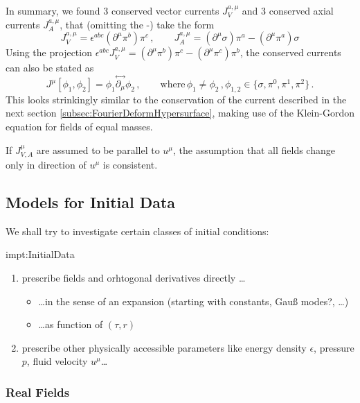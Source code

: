 In summary, we found 3 conserved vector currents $J_V^{a,\mu}$ and 3 conserved axial currents $J_A^{a,\mu}$, that (omitting the -) take the form
\begin{equation}
    J_V^{a,\mu}=\epsilon^{abc}(\partial^\mu\pi^b)\pi^c\,,\qquad J_A^{a,\mu}=(\partial^\mu\sigma)\pi^a-(\partial^\mu\pi^a)\sigma
\end{equation}
Using the projection $\epsilon^{abc}J_V^{a,\mu}=(\partial^\mu\pi^b)\pi^c-(\partial^\mu\pi^c)\pi^b$, the conserved currents can also be stated as
\begin{equation}
    J^\mu[\phi_1,\phi_2]=\phi_1\overset{\leftrightarrow}{\partial_\mu}\phi_2\,,\qquad\text{where}\,\phi_{1}\neq\phi_2\,,\phi_{1,2}\in\{\sigma,\pi^0,\pi^1,\pi^2\}\,.
\end{equation}
This looks strinkingly similar to the conservation of the current described in the next section \eqref{subsec:FourierDeformHypersurface}, making use of the Klein-Gordon equation for fields of equal masses.

If $J^\mu_{V,A}$ are assumed to be parallel to $u^\mu$, the assumption that all fields change only in direction of $u^\mu$ is consistent.


\subsection{Models for Initial Data}

We shall try to investigate certain classes of initial conditions:
\begin{impt}{impt:InitialData}
\begin{enumerate}
    \item prescribe fields and orhtogonal derivatives directly \dots
    \begin{itemize}
        \item \dots in the sense of an expansion (starting with constants, Gauß modes?, \dots)
        \item \dots as function of $(\tau,r)$
    \end{itemize}
    \item prescribe other physically accessible parameters like energy density $\epsilon$, pressure $p$, fluid velocity $u^\mu$\dots
\end{enumerate}
\end{impt}

\subsubsection{Real Fields}
\label{sec:FluidFromRealScalar}

